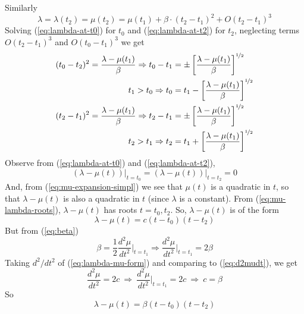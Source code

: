 \documentclass[12pt]{report}
\begin{document}
Similarly
\begin{equation}
  \label{eq:lambda-at-t2}
  \lambda = \lambda(t_2) = \mu(t_2) = \mu(t_1) + \beta \cdot (t_2-t_1)^2+O(t_2-t_1)^3
\end{equation}
Solving (\ref{eq:lambda-at-t0}) for $t_0$ and (\ref{eq:lambda-at-t2})
for $t_2$, neglecting terms $O(t_2 - t_1)^3$ and $O(t_0 - t_1 )^3$ we get
\begin{equation}
  \label{eq:t1-t2-implications}
  \begin{split}
    (t_0-t_2)^2 = \frac{\lambda-\mu(t_1)}{\beta} \Rightarrow t_0-t_1 & = \pm\left[\frac{\lambda-\mu(t_1)}{\beta}\right]^{\nicefrac{1}{2}}\\
    t_1>t_0 \Rightarrow t_0 & = t_1 - \left[\frac{\lambda-\mu(t_1)}{\beta}\right]^{\nicefrac{1}{2}}\\
    (t_2-t_1)^2 = \frac{\lambda-\mu(t_1)}{\beta} \Rightarrow t_2 - t_1 & = \pm\left[\frac{\lambda-\mu(t_1)}{\beta}\right]^{\nicefrac{1}{2}}\\
    t_2>t_1 \Rightarrow t_2 & = t_1  + \left[\frac{\lambda-\mu(t_1)}{\beta}\right]^{\nicefrac{1}{2}}
  \end{split}
\end{equation}
Observe from (\ref{eq:lambda-at-t0}) and (\ref{eq:lambda-at-t2}),
\begin{equation}
  \label{eq:mu-lambda-roots}
  (\lambda - \mu(t))\rvert_{t=t_0} = (\lambda - \mu(t))\rvert_{t=t_2} = 0
\end{equation}
And, from (\ref{eq:mu-expansion-simpl}) we see that $\mu(t)$ is a quadratic in $t$,
so that $\lambda-\mu(t)$ is also a quadratic in $t$ (since $\lambda$
is a constant).  From (\ref{eq:mu-lambda-roots}), $\lambda - \mu(t)$ has
roots $t=t_0,t_2$.  So, $\lambda - \mu(t)$ is of the form
\begin{equation}
  \label{eq:lambda-mu-form}
  \lambda-\mu(t) = c(t-t_0)(t-t_2)
\end{equation}
But from (\ref{eq:beta})
\begin{equation}
  \label{eq:d2mudt}
  \beta = \frac{1}{2}\frac{d^2\mu}{dt^2}\Biggr\rvert_{t=t_1}
  \Rightarrow \frac{d^2\mu}{dt^2}\Biggr\rvert_{t=t_1} = 2\beta
\end{equation}
Taking ${d^2}/{dt^2}$ of (\ref{eq:lambda-mu-form}) and comparing
to (\ref{eq:d2mudt}), we get
\begin{equation*}
  \frac{d^2\mu}{dt^2} = 2c \:\Rightarrow\:
  \frac{d^2\mu}{dt^2}\Biggr\rvert_{t=t_1}=2c \:\Rightarrow\: c = \beta
\end{equation*}
So
\begin{equation}
  \label{eq:lambda-mu-beta}
  \lambda - \mu(t) = \beta(t-t_0)(t-t_2)
\end{equation}
\end{document}
